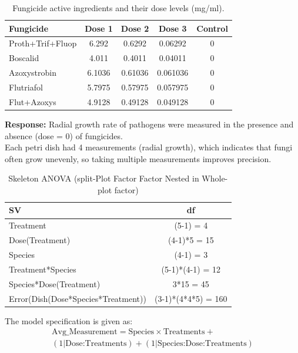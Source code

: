 \documentclass[
  10pt,
  letterpaper,
  twocolumn]{article}
\begin{document}
\begin{table}[h!]
\scriptsize
\centering
\caption{Fungicide active ingredients and their dose levels (mg/ml).}
\begin{tabular}{|l|c|c|c|c|}
\hline
\textbf{Fungicide} & \textbf{Dose 1} & \textbf{Dose 2} & \textbf{Dose 3} & \textbf{Control} \\
\hline
Proth+Trif+Fluop & 6.292 & 0.6292 & 0.06292 & 0 \\
Boscalid & 4.011 & 0.4011 & 0.04011 & 0 \\
Azoxystrobin & 6.1036 & 0.61036 & 0.061036 & 0 \\
Flutriafol & 5.7975 & 0.57975 & 0.057975 & 0 \\
Flut+Azoxys & 4.9128 & 0.49128 & 0.049128 & 0 \\
\hline
\end{tabular}
\end{table}

\textbf{Response:} Radial growth rate of pathogens were measured in the
presence and absence (dose = 0) of fungicides.\\
Each petri dish had 4 measurements (radial growth), which indicates that
fungi often grow unevenly, so taking multiple measurements improves
precision.

\begin{table}[h!]
\scriptsize
\centering
\caption{Skeleton ANOVA (split-Plot Factor Factor Nested in Whole-plot factor)}
\begin{tabular}{|l|c|}
\hline
\textbf{SV} & \textbf{df} \\
\hline
Treatment & (5-1) = 4 \\
\hline
Dose(Treatment) & (4-1)*5 = 15 \\
\hline
Species & (4-1) = 3 \\
\hline
Treatment*Species & (5-1)*(4-1) = 12 \\
\hline
Species*Dose(Treatment) & 3*15 = 45 \\
\hline
Error(Dish(Dose*Species*Treatment)) & (3-1)*(4*4*5) = 160 \\
\hline
\end{tabular}
\end{table}

\vspace{-0.3cm}
The model specification is given as:
\begin{multline}
\text{Avg\_Measurement} = \text{Species} \times \text{Treatments} + \\
(1|\text{Dose:Treatments}) + (1|\text{Species:Dose:Treatments})
\end{multline}
\end{document}
